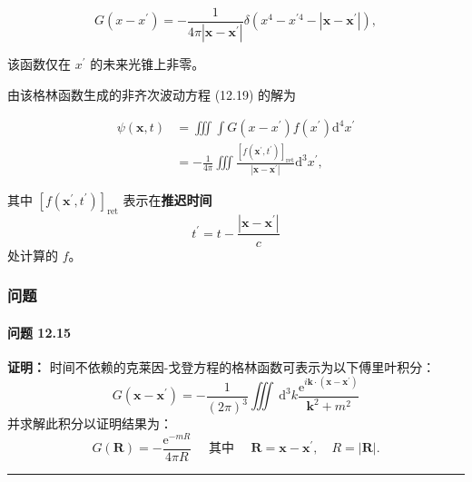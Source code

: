 \begin{equation}\label{eq:12.22} 
 G\left(x-x^{\prime}\right)=-\frac{1}{4 \pi\left|\mathbf{x}-\mathbf{x}^{\prime}\right|} \delta\left(x^{4}-x^{\prime 4}-\left|\mathbf{x}-\mathbf{x}^{\prime}\right|\right), 
 \end{equation}

该函数仅在 $x^{\prime}$ 的未来光锥上非零。

由该格林函数生成的非齐次波动方程 (12.19) 的解为

\begin{equation}
\begin{aligned}
\psi(\mathbf{x}, t) & =\iiint \int G\left(x-x^{\prime}\right) f\left(x^{\prime}\right) \mathrm{d}^{4} x^{\prime} \\
& =-\frac{1}{4 \pi} \iiint \frac{\left[f\left(\mathbf{x}^{\prime}, t^{\prime}\right)\right]_{\mathrm{ret}}}{\left|\mathbf{x}-\mathbf{x}^{\prime}\right|} \mathrm{d}^{3} x^{\prime},
\end{aligned}
\end{equation}

其中
$\left[f\left(\mathbf{x}^{\prime}, t^{\prime}\right)\right]_{\text{ret}}$
表示在\textbf{推迟时间}
 $$
t^{\prime}=t-\frac{\left|\mathbf{x}-\mathbf{x}^{\prime}\right|}{c}
$$
处计算的 $f$。

\subsubsection{问题}\label{ux95eeux9898-3}

\paragraph{问题 12.15}\label{ux95eeux9898-12.15}

\textbf{证明：}
时间不依赖的克莱因-戈登方程的格林函数可表示为以下傅里叶积分：
 $$
G\left(\mathbf{x}-\mathbf{x}^{\prime}\right)=-\frac{1}{(2 \pi)^{3}} \iiint \mathrm{~d}^{3} k \frac{\mathrm{e}^{i \mathbf{k} \cdot\left(\mathbf{x}-\mathbf{x}^{\prime}\right)}}{\mathbf{k}^{2}+m^{2}}
$$
并求解此积分以证明结果为：
 $$
G(\mathbf{R})=-\frac{\mathrm{e}^{-m R}}{4 \pi R} \quad \text { 其中 } \quad \mathbf{R}=\mathbf{x}-\mathbf{x}^{\prime}, \quad R=|\mathbf{R}|.
$$
\begin{center}\rule{0.5\linewidth}{0.5pt}\end{center}

